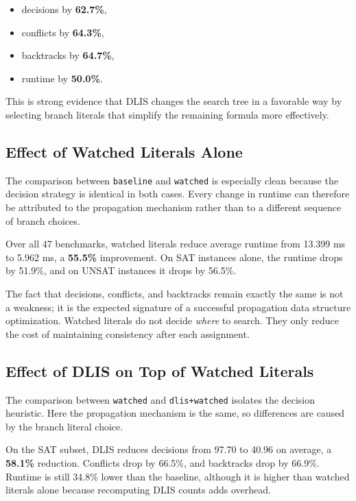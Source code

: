 \documentclass[11pt]{article}
\begin{document}
\begin{itemize}
    \item decisions by \textbf{62.7\%},
    \item conflicts by \textbf{64.3\%},
    \item backtracks by \textbf{64.7\%},
    \item runtime by \textbf{50.0\%}.
\end{itemize}

This is strong evidence that DLIS changes the search tree in a favorable way by
selecting branch literals that simplify the remaining formula more effectively.

\subsection{Effect of Watched Literals Alone}

The comparison between \texttt{baseline} and \texttt{watched} is especially
clean because the decision strategy is identical in both cases. Every change in
runtime can therefore be attributed to the propagation mechanism rather than to
a different sequence of branch choices.

Over all 47 benchmarks, watched literals reduce average runtime from 13.399 ms
to 5.962 ms, a \textbf{55.5\%} improvement. On SAT instances alone, the
runtime drops by 51.9\%, and on UNSAT instances it drops by 56.5\%.

The fact that decisions, conflicts, and backtracks remain exactly the same is
not a weakness; it is the expected signature of a successful propagation data
structure optimization. Watched literals do not decide \emph{where} to search.
They only reduce the cost of maintaining consistency after each assignment.

\subsection{Effect of DLIS on Top of Watched Literals}

The comparison between \texttt{watched} and \texttt{dlis+watched} isolates the
decision heuristic. Here the propagation mechanism is the same, so differences
are caused by the branch literal choice.

On the SAT subset, DLIS reduces decisions from 97.70 to 40.96 on average, a
\textbf{58.1\%} reduction. Conflicts drop by 66.5\%, and backtracks drop by
66.9\%. Runtime is still 34.8\% lower than the baseline, although it is higher
than watched literals alone because recomputing DLIS counts adds overhead.
\end{document}
